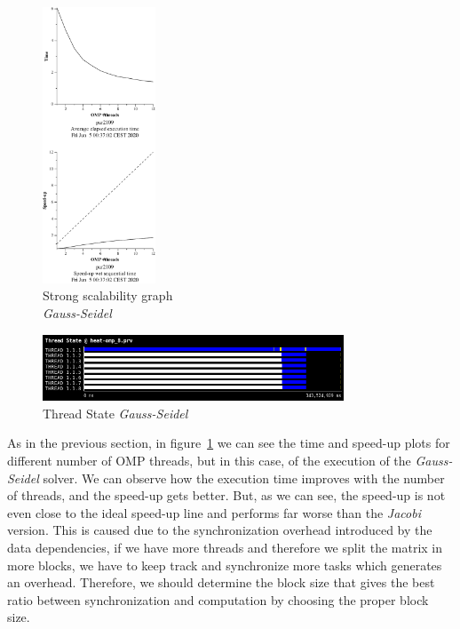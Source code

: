 \begin{figure}[H]
    \centering
    \includegraphics[width=0.3\textwidth]{heat-omp-strong-gauss-crop}
    \caption{Strong scalability graph \\ \emph{Gauss-Seidel}}%
    \label{fig:strong-gauss}
\end{figure}

\begin{figure}[H]
    \centering
    \includegraphics[width=0.8\textwidth]{thread_state_heat_omp_8}
    \caption{Thread State \emph{Gauss-Seidel}}%
    \label{fig:thread-gauss}
\end{figure}

As in the previous section, in figure~\ref{fig:strong-gauss} we can see the time and speed-up plots for different number 
of OMP threads, but in this case, of the execution of the \emph{Gauss-Seidel} solver. We can observe how the execution time improves with the number of threads, and the speed-up gets better. But, as we can see, the speed-up is not even close to the ideal speed-up line and performs far worse than the \emph{Jacobi} version.
This is caused due to the synchronization overhead introduced by the data dependencies, if we have more threads and
therefore we split the matrix in more blocks, we have to keep track and synchronize more tasks which generates an
overhead. Therefore, we should determine the block size that gives the best ratio between synchronization
and computation by choosing the proper block size.

